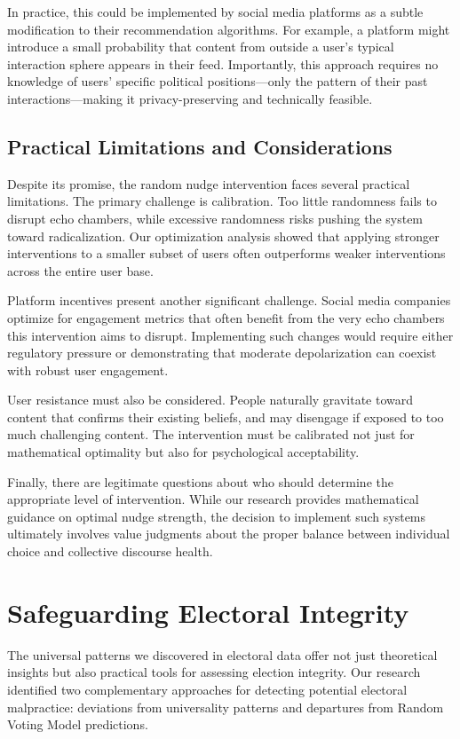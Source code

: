 In practice, this could be implemented by social media platforms as a subtle modification to their recommendation algorithms. For example, a platform might introduce a small probability that content from outside a user's typical interaction sphere appears in their feed. Importantly, this approach requires no knowledge of users' specific political positions—only the pattern of their past interactions—making it privacy-preserving and technically feasible.

\subsection{Practical Limitations and Considerations}

Despite its promise, the random nudge intervention faces several practical limitations. The primary challenge is calibration. Too little randomness fails to disrupt echo chambers, while excessive randomness risks pushing the system toward radicalization. Our optimization analysis showed that applying stronger interventions to a smaller subset of users often outperforms weaker interventions across the entire user base.

Platform incentives present another significant challenge. Social media companies optimize for engagement metrics that often benefit from the very echo chambers this intervention aims to disrupt. Implementing such changes would require either regulatory pressure or demonstrating that moderate depolarization can coexist with robust user engagement.

User resistance must also be considered. People naturally gravitate toward content that confirms their existing beliefs, and may disengage if exposed to too much challenging content. The intervention must be calibrated not just for mathematical optimality but also for psychological acceptability.

Finally, there are legitimate questions about who should determine the appropriate level of intervention. While our research provides mathematical guidance on optimal nudge strength, the decision to implement such systems ultimately involves value judgments about the proper balance between individual choice and collective discourse health.

\section{Safeguarding Electoral Integrity}

The universal patterns we discovered in electoral data offer not just theoretical insights but also practical tools for assessing election integrity. Our research identified two complementary approaches for detecting potential electoral malpractice: deviations from universality patterns and departures from Random Voting Model predictions.
